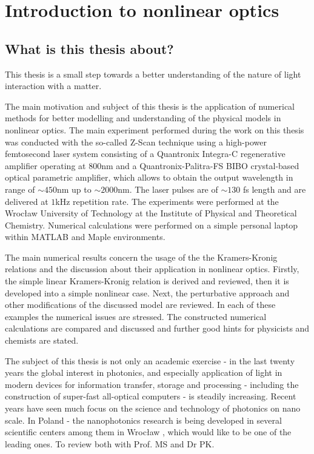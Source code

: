 \documentclass[12pt,twoside,a4paper]{article}
\numberwithin{equation}{subsection}
\numberwithin{figure}{subsection}
\begin{document}
\section{Introduction to nonlinear optics}  \label{chap:introducion}

\subsection{What is this thesis about?} \label{chap:introducion_what}


This thesis is a small step towards a better understanding of the nature of light interaction with a matter.

The main motivation and subject of this thesis is the application of numerical methods for better modelling and understanding of
the physical models in nonlinear optics. The main experiment performed during the work on this thesis was conducted with the
so-called Z-Scan technique using a high-power femtosecond laser system consisting of a Quantronix Integra-C regenerative amplifier operating at
$800$nm and a Quantronix-Palitra-FS BIBO crystal-based optical parametric amplifier, which allows to obtain the output
wavelength in range of $\sim 450$nm up to $\sim 2000$nm. The laser pulses are of $\sim 130$ fs length and are delivered at $1$kHz repetition
rate. The experiments were performed at the Wrocław University of Technology at the Institute of Physical and Theoretical
Chemistry. Numerical calculations were performed on a simple personal laptop within MATLAB and Maple environments.

The main numerical results concern the usage of the the Kramers-Kronig relations and the discussion about their application in
nonlinear optics. Firstly, the simple linear Kramers-Kronig relation is derived and reviewed, then it is developed into a simple
nonlinear case. Next, the perturbative approach and other modifications of the discussed model are reviewed. In each of these
examples the numerical issues are stressed. The constructed numerical calculations are compared and discussed and further good
hints for physicists and chemists are stated.

The subject of this thesis is not only an academic exercise - in the last twenty years the global interest in photonics, and
especially application of light in modern devices for information transfer, storage and processing - including the construction of super-fast
all-optical computers - is steadily increasing. Recent years have seen much focus on the science and technology of photonics on
nano scale. In Poland - the nanophotonics research is being developed in several scientific centers among them in Wrocław , which
would like to be one of the leading ones. To review both with Prof. MS and Dr PK.
\end{document}
